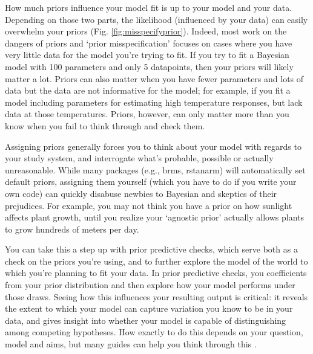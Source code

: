 \documentclass[11pt]{article}
\begin{document}
{How much priors influence your model fit is up to your model and your data. Depending on those two parts, the likelihood (influenced by your data) can easily overwhelm your priors (Fig. \ref{fig:misspecifyprior}). Indeed, most work on the dangers of priors and `prior misspecification'  focuses on cases where you have very little data for the model you're trying to fit. If you try to fit a Bayesian model with 100 parameters and only 5 datapoints, then your priors will likely matter a lot. Priors can also matter when you have fewer parameters and lots of data but the data are not informative for the model; for example, if you fit a model including parameters for estimating high temperature responses, but lack data at those temperatures. Priors, however, can only matter more than you know when you fail to think through and check them. 

Assigning priors generally forces you to think about your model with regards to your study system, and interrogate what's probable, possible or actually unreasonable. While many packages (e.g., \textsf{brms, rstanarm}) will automatically set default priors, assigning them yourself (which you have to do if you write your own code) can quickly disabuse newbies to Bayesian and skeptics of their prejudices. For example, you may not think you have a prior on how sunlight affects plant growth, until you realize your `agnostic prior' actually allows plants to grow hundreds of meters per day. %

You can take this a step up with prior predictive checks, which serve both as a check on the priors you're using, and to further explore the model of the world to which you're planning to fit your data. In prior predictive checks, you coefficients from your prior distribution and then explore how your model performs under those draws. Seeing how this influences your resulting output is critical: it reveals the extent to which your model can capture variation you know to be in your data, and gives insight into whether your model is capable of distinguishing among competing hypotheses. How exactly to do this depends on your question, model and aims, but many guides can help you think through this \citep{betanprior,wesner2021,winter2023}. 

}
\end{document}
